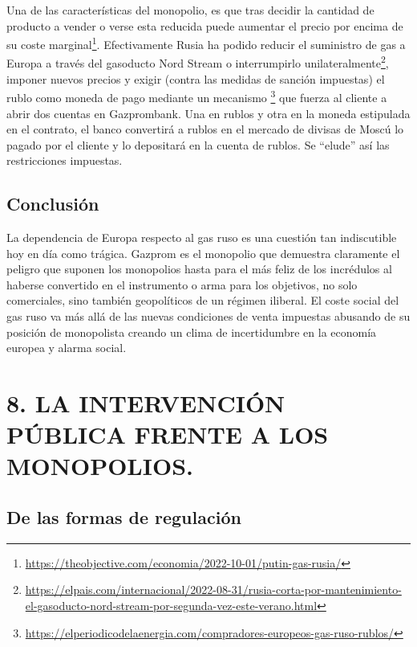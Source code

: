 \documentclass[
]{article}
\begin{document}
Una de las características del monopolio, es que tras decidir la
cantidad de producto a vender o verse esta reducida puede aumentar el
precio por encima de su coste marginal\footnote{\url{https://theobjective.com/economia/2022-10-01/putin-gas-rusia/}}.
Efectivamente Rusia ha podido reducir el suministro de gas a Europa a
través del gasoducto Nord Stream o interrumpirlo
unilateralmente\footnote{\url{https://elpais.com/internacional/2022-08-31/rusia-corta-por-mantenimiento-el-gasoducto-nord-stream-por-segunda-vez-este-verano.html}},
imponer nuevos precios y exigir (contra las medidas de sanción
impuestas) el rublo como moneda de pago mediante un mecanismo
\footnote{\url{https://elperiodicodelaenergia.com/compradores-europeos-gas-ruso-rublos/}}
que fuerza al cliente a abrir dos cuentas en Gazprombank. Una en rublos
y otra en la moneda estipulada en el contrato, el banco convertirá a
rublos en el mercado de divisas de Moscú lo pagado por el cliente y lo
depositará en la cuenta de rublos. Se ``elude'' así las restricciones
impuestas.

\hypertarget{conclusiuxf3n-3}{%
\subsection*{Conclusión}\label{conclusiuxf3n-3}}

La dependencia de Europa respecto al gas ruso es una cuestión tan
indiscutible hoy en día como trágica. Gazprom es el monopolio que
demuestra claramente el peligro que suponen los monopolios hasta para el
más feliz de los incrédulos al haberse convertido en el instrumento o
arma para los objetivos, no solo comerciales, sino también geopolíticos
de un régimen iliberal. El coste social del gas ruso va más allá de las
nuevas condiciones de venta impuestas abusando de su posición de
monopolista creando un clima de incertidumbre en la economía europea y
alarma social.

\hypertarget{la-intervenciuxf3n-puxfablica-frente-a-los-monopolios.}{%
\section{8. LA INTERVENCIÓN PÚBLICA FRENTE A LOS
MONOPOLIOS.}\label{la-intervenciuxf3n-puxfablica-frente-a-los-monopolios.}}

\hypertarget{de-las-formas-de-regulaciuxf3n}{%
\subsection*{De las formas de
regulación}\label{de-las-formas-de-regulaciuxf3n}}
\end{document}
